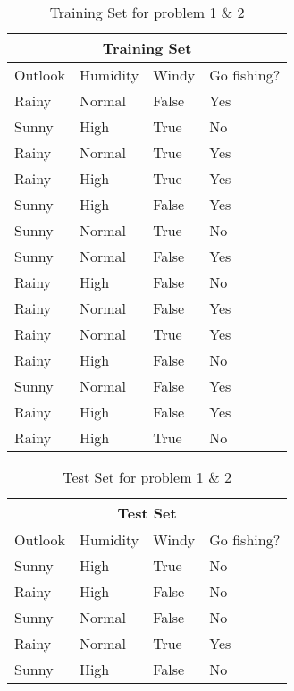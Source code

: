 \documentclass[11pt]{article}
\begin{document}
 
\begin{table}
\centering
\begin{tabular}{ |p{2cm}|p{2cm}|p{2cm}||p{2cm}|  }

 \hline
 \multicolumn{4}{|c|}{Training Set} \\
 \hline
 Outlook & Humidity & Windy & Go fishing?\\
 \hline
 Rainy & Normal & False & Yes\\
 Sunny & High & True & No\\
 Rainy & Normal & True & Yes\\
 Rainy & High & True & Yes\\
 Sunny & High & False & Yes\\
 Sunny & Normal & True & No\\
 Sunny & Normal & False & Yes\\
 Rainy & High & False & No\\
 Rainy & Normal & False & Yes\\
 Rainy & Normal & True & Yes\\
 Rainy & High & False & No\\
 Sunny & Normal & False & Yes\\
 Rainy & High & False & Yes\\
 Rainy & High & True & No\\
 \hline
 
\end{tabular}
\caption{Training Set for problem 1 \& 2}
\label{table:training}
\end{table}

\begin{table}
\centering
\begin{tabular}{ |p{2cm}|p{2cm}|p{2cm}||p{2cm}|  }

 \hline
 \multicolumn{4}{|c|}{Test Set} \\
 \hline
 Outlook & Humidity & Windy & Go fishing?\\
 \hline
 Sunny & High & True & No\\
 Rainy & High & False & No\\
 Sunny & Normal & False & No\\
 Rainy & Normal & True & Yes\\
 Sunny & High & False & No\\
 \hline
 
\end{tabular}
\caption{Test Set for problem 1 \& 2}
\label{table:test}
\end{table}
\end{document}
